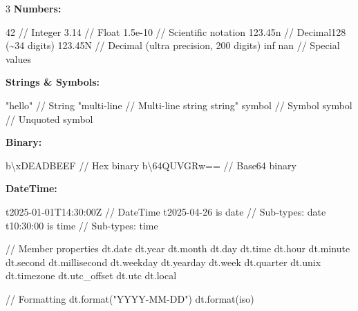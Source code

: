 \documentclass[8pt,landscape,a4paper,oneside]{article}
\newenvironment{Shaded}{%
  \begin{snugshade}%
  \vspace{0.4\baselineskip}%
  \fontsize{9}{10}\selectfont%
  \setlength{\parskip}{0pt}%
  \setlength{\topsep}{0pt}%
  \setlength{\partopsep}{0pt}%
}{%
  \vspace{0.01\baselineskip}%
  \end{snugshade}%
}
\newcommand{\NormalTok}[1]{#1}
\begin{document}
\begin{multicols*}{3}
\textbf{Numbers:}

\begin{Shaded}
\begin{Highlighting}[]
\NormalTok{42        // Integer}
\NormalTok{3.14      // Float}
\NormalTok{1.5e{-}10   // Scientific notation}
\NormalTok{123.45n   // Decimal128 (\textasciitilde{}34 digits)}
\NormalTok{123.45N   // Decimal (ultra precision, 200 digits)}
\NormalTok{inf  nan  // Special values}
\end{Highlighting}
\end{Shaded}

\textbf{Strings \& Symbols:}

\begin{Shaded}
\begin{Highlighting}[]
\NormalTok{"hello"           // String}
\NormalTok{"multi{-}line       // Multi{-}line string}
\NormalTok{string"}
\NormalTok{\textquotesingle{}symbol\textquotesingle{}          // Symbol}
\NormalTok{symbol            // Unquoted symbol}
\end{Highlighting}
\end{Shaded}

\textbf{Binary:}

\begin{Shaded}
\begin{Highlighting}[]
\NormalTok{b\textquotesingle{}\textbackslash{}xDEADBEEF\textquotesingle{}     // Hex binary}
\NormalTok{b\textquotesingle{}\textbackslash{}64QUVGRw==\textquotesingle{}    // Base64 binary}
\end{Highlighting}
\end{Shaded}

\textbf{DateTime:}

\begin{Shaded}
\begin{Highlighting}[]
\NormalTok{t\textquotesingle{}2025{-}01{-}01T14:30:00Z\textquotesingle{}  // DateTime}
\NormalTok{t\textquotesingle{}2025{-}04{-}26\textquotesingle{} is date       // Sub{-}types: date}
\NormalTok{t\textquotesingle{}10:30:00\textquotesingle{} is time         // Sub{-}types: time}

\NormalTok{// Member properties}
\NormalTok{dt.date  dt.year  dt.month  dt.day}
\NormalTok{dt.time  dt.hour  dt.minute dt.second  dt.millisecond}
\NormalTok{dt.weekday  dt.yearday  dt.week  dt.quarter}
\NormalTok{dt.unix  dt.timezone  dt.utc\_offset  dt.utc  dt.local}

\NormalTok{// Formatting}
\NormalTok{dt.format("YYYY{-}MM{-}DD")  dt.format(\textquotesingle{}iso\textquotesingle{})}


\end{Highlighting}
\end{Shaded}
\end{multicols*}
\end{document}
